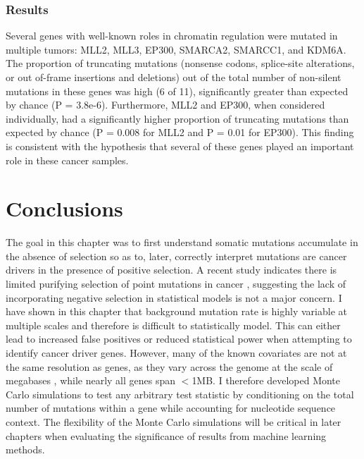 \subsubsection{Results}

Several genes with well-known roles in chromatin regulation were mutated in multiple tumors: MLL2, MLL3, EP300, SMARCA2, SMARCC1, and KDM6A. The proportion of truncating mutations (nonsense codons, splice-site alterations, or out of-frame insertions and deletions) out of the total number of non-silent mutations in these genes was high (6 of 11), significantly greater than expected by chance (P = 3.8e-6). Furthermore, MLL2 and EP300, when considered individually, had a significantly higher proportion of truncating mutations than expected by chance (P = 0.008 for MLL2 and P = 0.01 for EP300). This finding is consistent with the hypothesis that several of these genes played an important role in these cancer samples.

\section{Conclusions}

The goal in this chapter was to first understand  somatic mutations accumulate in the absence of selection so as to, later, correctly interpret  mutations are cancer drivers in the presence of positive selection. A recent study indicates there is limited purifying selection of point mutations in cancer \cite{RN56}, suggesting the lack of incorporating negative selection in statistical models is not a major concern. I have shown in this chapter that background mutation rate is highly variable at multiple scales and therefore is difficult to statistically model. This can either lead to increased false positives or reduced statistical power when attempting to identify cancer driver genes. However, many of the known covariates are not at the same resolution as genes, as they vary across the genome at the scale of megabases \cite{RN74}, while nearly all genes span $<$1MB. I therefore developed Monte Carlo simulations to test any arbitrary test statistic by conditioning on the total number of mutations within a gene while accounting for nucleotide sequence context. The flexibility of the Monte Carlo simulations will be critical in later chapters when evaluating the significance of results from machine learning methods. 